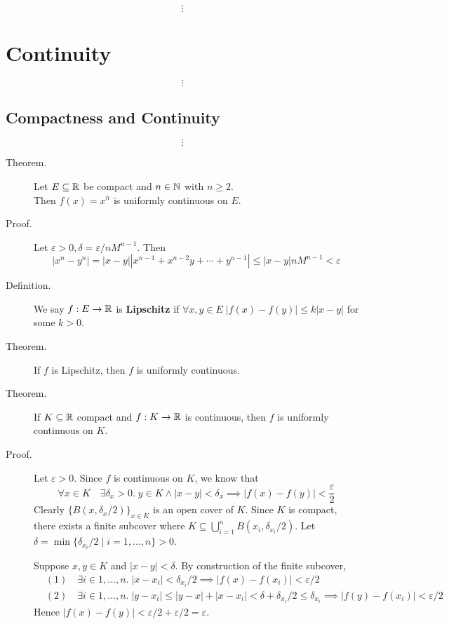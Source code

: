 \documentclass[letterpaper,11pt]{article}
\begin{document}
\[
\vdots
\]

\setcounter{section}{4}
\section{Continuity}
\[
\vdots
\]

\setcounter{subsection}{2}
\subsection{Compactness and Continuity}
\[
\vdots
\]
\begin{description}
\item[Theorem.] Let $E\subseteq\mathbb{R}$ be compact and $n\in\mathbb{N}$ with $n\ge 2$.\\
  Then $f(x)=x^n$ is uniformly continuous on $E$.

\item[Proof.] Let $\varepsilon>0, \delta=\varepsilon/nM^{n-1}$.
  Then \[
  |x^n-y^n|=|x-y||x^{n-1}+x^{n-2}y+\cdots+y^{n-1}|\le|x-y|nM^{n-1}<\varepsilon
  \]

\item[Definition.] We say $f:E\to\mathbb{R}$ is \textbf{Lipschitz}
  if $\forall x,y\in E\;|f(x)-f(y)|\le k|x-y|$ for some $k>0$.

\item[Theorem.] If $f$ is Lipschitz, then $f$ is uniformly continuous.

\item[Theorem.] If $K\subseteq\mathbb{R}$ compact and $f:K\to\mathbb{R}$ is continuous,
    then $f$ is uniformly continuous on $K$.

\item[Proof.] Let $\varepsilon>0$. Since $f$ is continuous on $K$, we know that
  \[
  \forall x\in K\quad \exists\delta_x>0.\;y\in K\wedge|x-y|<\delta_x
      \implies|f(x)-f(y)|<\frac{\varepsilon}{2}
  \]
  Clearly $\{B(x,\delta_x/2)\}_{x\in K}$ is an open cover of $K$.
  Since $K$ is compact, there exists a finite subcover where
  $K\subseteq\bigcup_{i=1}^n B(x_i,\delta_{x_i}/2)$.
  Let $\delta=\min\{\delta_{x_i}/2\;|\;i=1,\ldots,n\}>0$.

  Suppose $x,y\in K$ and $|x-y|<\delta$. By construction of the finite subcover,
  \begin{align*}
  &(1)\quad\exists i\in 1,\ldots, n.\;|x-x_i|<\delta_{x_i}/2
      \implies|f(x)-f(x_i)|<\varepsilon/2\\
  &(2)\quad\exists i\in 1,\ldots, n.\;|y-x_i|\le|y-x|+|x-x_i|
      <\delta+\delta_{x_i}/2\le\delta_{x_i}
      \implies|f(y)-f(x_i)|<\varepsilon/2
  \end{align*}
  Hence $|f(x)-f(y)|<\varepsilon/2+\varepsilon/2=\varepsilon$.
\end{description}
\end{document}
